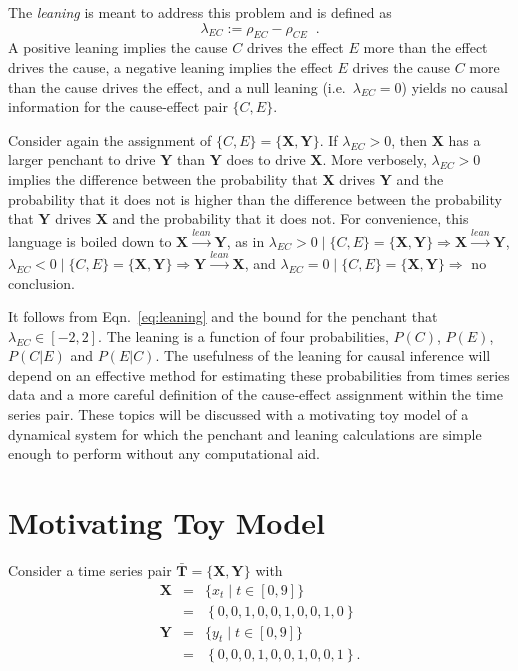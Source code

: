\documentclass[a4paper,11pt,twocolumn]{article}
\begin{document}
The {\em leaning} is meant to address this problem and is defined as
\begin{equation}
\label{eq:leaning}
\lambda_{EC} := \rho_{EC} - \rho_{CE}\;\;.
\end{equation}
A positive leaning implies the cause $C$ drives the effect $E$ more than the effect drives the cause, a negative leaning implies the effect $E$ drives the cause $C$ more than the cause drives the effect, and a null leaning (i.e.\ $\lambda_{EC} = 0$) yields no causal information for the cause-effect pair $\{C,E\}$.  

Consider again the assignment of $\{C,E\}=\{\mathbf{X},\mathbf{Y}\}$.  If $\lambda_{EC}>0$, then $\mathbf{X}$ has a larger penchant to drive $\mathbf{Y}$ than $\mathbf{Y}$ does to drive $\mathbf{X}$.  More verbosely, $\lambda_{EC}>0$ implies the difference between the probability that $\mathbf{X}$ drives $\mathbf{Y}$ and the probability that it does not is higher than the difference between the probability that $\mathbf{Y}$ drives $\mathbf{X}$ and the probability that it does not.  For convenience, this language is boiled down to $\mathbf{X}\xrightarrow{lean}\mathbf{Y}$, as in
$\lambda_{EC}>0\;|\; \{C,E\}=\{\mathbf{X},\mathbf{Y}\}\Rightarrow\mathbf{X}\xrightarrow{lean}\mathbf{Y}$, $\lambda_{EC}<0\;|\; \{C,E\}=\{\mathbf{X},\mathbf{Y}\}\Rightarrow\mathbf{Y}\xrightarrow{lean}\mathbf{X}$, and $\lambda_{EC}=0\;|\; \{C,E\}=\{\mathbf{X},\mathbf{Y}\}\Rightarrow$ no conclusion.

It follows from Eqn.\ \ref{eq:leaning} and the bound for the penchant that $\lambda_{EC}\in\left[-2,2\right]$.  The leaning is a function of four probabilities, $P(C)$, $P(E)$, $P(C|E)$ and $P(E|C)$.  The usefulness of the leaning for causal inference will depend on an effective method for estimating these probabilities from times series data and a more careful definition of the cause-effect assignment within the time series pair.  These topics will be discussed with a motivating toy model of a dynamical system for which the penchant and leaning calculations are simple enough to perform without any computational aid.

\section{Motivating Toy Model}
Consider a time series pair $\bar{\mathbf{T}}=\{\mathbf{X},\mathbf{Y}\}$ with
\begin{eqnarray*}
\mathbf{X} &=& \{x_t\; | \; t\in[0,9]\}\\
&=& \left\{0,0,1,0,0,1,0,0,1,0\right\}\\
\mathbf{Y} &=& \{y_t\; | \; t\in[0,9]\}\\
&=& \left\{0,0,0,1,0,0,1,0,0,1\right\}.
\end{eqnarray*}
\end{document}
